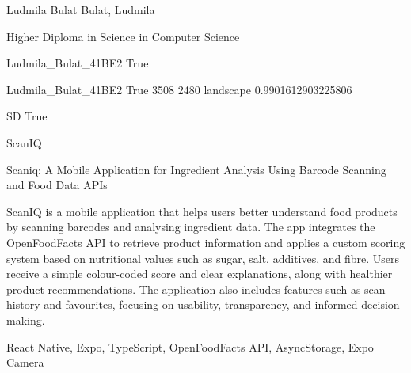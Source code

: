 
\begingroup{}\relax



\def\Key{Ludmila_Bulat_41BE2}

{Ludmila Bulat}
{Bulat, Ludmila}

{Higher Diploma in Science in Computer Science}

{Ludmila_Bulat_41BE2}
{True}

{Ludmila_Bulat_41BE2}
{True}
{3508}
{2480}
{landscape}
{0.9901612903225806}

{SD}
{True}

{ScanIQ}

{Scaniq: A Mobile Application for Ingredient Analysis Using Barcode Scanning and Food Data APIs}

{ScanIQ is a mobile application that helps users better understand food products by scanning barcodes and analysing ingredient data. The app integrates the OpenFoodFacts API to retrieve product information and applies a custom scoring system based on nutritional values such as sugar, salt, additives, and fibre. Users receive a simple colour-coded score and clear explanations, along with healthier product recommendations. The application also includes features such as scan history and favourites, focusing on usability, transparency, and informed decision-making.}

{React Native, Expo, TypeScript, OpenFoodFacts API, AsyncStorage, Expo Camera}

